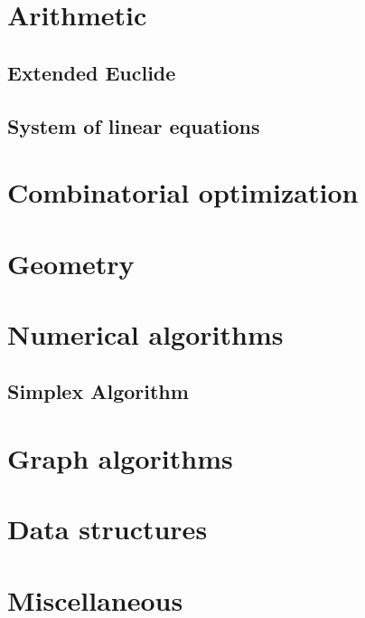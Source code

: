 \section{Arithmetic}
\subsection{Extended Euclide}
\raggedbottom
\hrulefill
\subsection{System of linear equations}
\raggedbottom
\hrulefill

\section{Combinatorial optimization}

\section{Geometry}

\section{Numerical algorithms}
\subsection{Simplex Algorithm}
\raggedbottom
\hrulefill

\section{Graph algorithms}

\section{Data structures}

\section{Miscellaneous}

